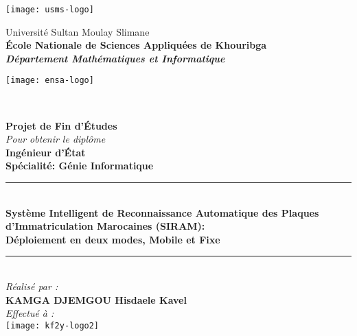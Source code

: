 \begin{titlepage}
\begin{minipage}{2cm}
	\begin{flushleft}
		\texttt{[image: usms-logo]}
	\end{flushleft}
\end{minipage}\hfill
\begin{minipage}{12cm}
	\begin{center}
		Université Sultan Moulay Slimane\\
		\textbf{École Nationale de Sciences Appliquées de Khouribga}\\
		\textit{\textbf{Département Mathématiques et Informatique}}
	\end{center}
\end{minipage}\hfill
\begin{minipage}{2cm}
	\begin{flushright}
		\texttt{[image: ensa-logo]}
	\end{flushright}
\end{minipage}\\

\begin{center}

{\Huge \bfseries Projet de Fin d’Études}\\[0.5cm]
\textit{Pour obtenir le diplôme}\\
{\LARGE \textbf{Ingénieur d'État}}\\[0.5cm]
{\Large \bfseries{Spécialité: Génie Informatique} \\ }

\vfill
\rule{0.95\textwidth}{2pt}\\
	\Large \textbf{Système Intelligent de Reconnaissance Automatique des Plaques d'Immatriculation Marocaines (SIRAM):}\\
	\textbf{Déploiement en deux modes, Mobile et Fixe}
\rule{0.95\textwidth}{2pt}\\

\vfill
\emph{Réalisé par :}\\[0.5cm]
\Large \textbf{\textsc{KAMGA DJEMGOU} Hisdaele Kavel}\\

\vfill
\emph{Effectué à :}\\[0.5cm]
\texttt{[image: kf2y-logo2]}
\end{center}


\end{titlepage}
